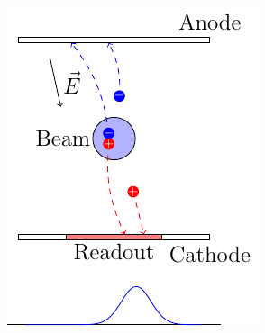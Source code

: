 \begin{frame}
\begin{columns}
\begin{column}{0.45\textwidth}
      \includegraphics[width=\textwidth]{03_SIM/fig/fig000_IPM_distorsion.pdf}
    \end{column}
  \end{columns}
\end{frame}

